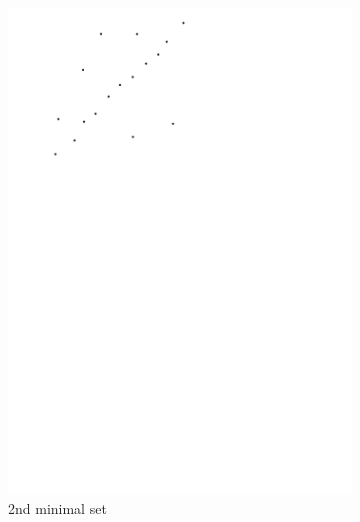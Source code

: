 \begin{figure}
\begin{subfigure}[b]{0.24\linewidth}
		\includegraphics[width=\textwidth,page=3]{ransac.pdf}
		\caption{2nd minimal set}\label{fig:ransac:c}
	\end{subfigure}
	\begin{subfigure}[b]{0.24\linewidth}
		\centering

\end{subfigure}
\end{figure}
